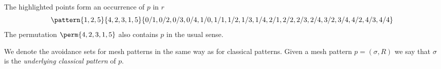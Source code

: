 The highlighted points form an occurrence of \(p\) in \(r\)
\begin{equation*}
    \pattern{1,2,5}{4,2,3,1,5}{0/1,0/2,0/3,0/4,
                               1/0,1/1,1/2,1/3,1/4,
                               2/1,2/2,2/3,2/4,
                               3/2,3/4,
                               4/2,4/3,4/4}
\end{equation*}
The permutation \(\perm{4,2,3,1,5}\) also contains \(p\) in the usual sense.

We denote the avoidance sets for mesh patterns in the same way as for
classical patterns. Given a mesh pattern \(p=(\sigma,R)\) we say that \(\sigma\) is the \emph{underlying
classical pattern} of \(p\).
